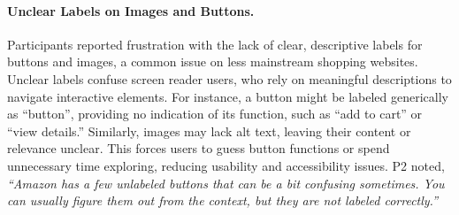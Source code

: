 \paragraph{\textbf{Unclear Labels on Images and Buttons.}}
Participants reported frustration with the lack of clear, descriptive labels for buttons and images, a common issue on less mainstream shopping websites. Unclear labels confuse screen reader users, who rely on meaningful descriptions to navigate interactive elements. For instance, a button might be labeled generically as ``button'', providing no indication of its function, such as ``add to cart'' or ``view details.'' Similarly, images may lack alt text, leaving their content or relevance unclear. This forces users to guess button functions or spend unnecessary time exploring, reducing usability and accessibility issues. P2 noted, \textit{``Amazon has a few unlabeled buttons that can be a bit confusing sometimes. You can usually figure them out from the context, but they are not labeled correctly.''}



